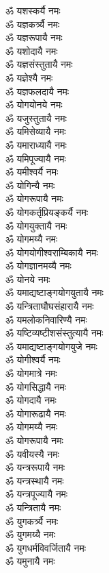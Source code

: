 \begin{flushleft}
\begin{multicols}{2}
ॐ यशस्कर्यै नमः\\
ॐ यज्ञकर्त्र्यै नमः\\
ॐ यज्ञरूपायै नमः\\
ॐ यशोदायै नमः\hfill{}\\
ॐ यज्ञसंस्तुतायै नमः\\
ॐ यज्ञेश्यै नमः\\
ॐ यज्ञफलदायै नमः\\
ॐ योगयोनये नमः\\
ॐ यजुस्तुतायै नमः\\
ॐ यमिसेव्यायै नमः\\
ॐ यमाराध्यायै नमः\\
ॐ यमिपूज्यायै नमः\\
ॐ यमीश्वर्यै नमः\\
ॐ योगिन्यै नमः\hfill{}\\
ॐ योगरूपायै नमः\\
ॐ योगकर्तृप्रियङ्कर्यै नमः\\
ॐ योगयुक्तायै नमः\\
ॐ योगमय्यै नमः\\
ॐ योगयोगीश्वराम्बिकायै नमः\\
ॐ योगज्ञानमय्यै नमः\\
ॐ योनये नमः\\
ॐ यमाद्यष्टाङ्गयोगयुतायै नमः\\
ॐ यन्त्रिताघौघसंहारायै नमः\\
ॐ यमलोकनिवारिण्यै नमः\hfill{}\\
ॐ यष्टिव्यष्टीशसंस्तुत्यायै नमः\\
ॐ यमाद्यष्टाङ्गयोगयुजे नमः\\
ॐ योगीश्वर्यै नमः\\
ॐ योगमात्रे नमः\\
ॐ योगसिद्धायै नमः\\
ॐ योगदायै नमः\\
ॐ योगारूढायै नमः\\
ॐ योगमय्यै नमः\\
ॐ योगरूपायै नमः\\
ॐ यवीयस्यै नमः\hfill{}\\
ॐ यन्त्ररूपायै नमः\\
ॐ यन्त्रस्थायै नमः\\
ॐ यन्त्रपूज्यायै नमः\\
ॐ यन्त्रितायै नमः\\
ॐ युगकर्त्र्यै नमः\\
ॐ युगमय्यै नमः\\
ॐ युगधर्मविवर्जितायै नमः\\
ॐ यमुनायै नमः\\

\end{multicols}
\end{flushleft}
